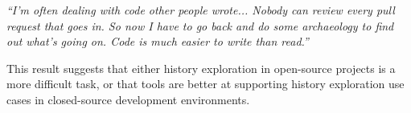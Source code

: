 \begin{displayquote}
\textit{``I'm often dealing with code other people wrote... Nobody can review every pull request that goes in. So now I have to go back and do some archaeology to find out what's going on. Code is much easier to write than read.''}
\end{displayquote}

This result suggests that either history exploration in open-source projects is a more difficult task, or that tools are better at supporting history exploration use cases in closed-source development environments.

